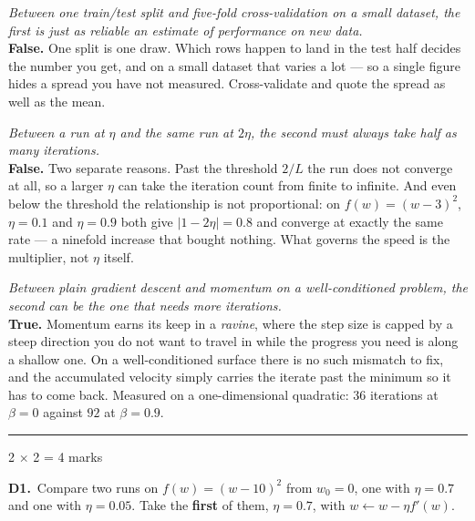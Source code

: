 \documentclass[10pt,a4paper]{article}
\newcommand{\parthead}[2]{\vspace{2pt}\noindent\rule{\linewidth}{0.4pt}\par\vspace{2pt}%
  \noindent{\bfseries Part #1}\hfill{\small #2}\par\vspace{1pt}}
\begin{document}
\begin{sC}

  \item \emph{Between one train/test split and five-fold cross-validation on a small dataset, the first is just as reliable an estimate of performance on new data.}\\[2pt] \textbf{False.} One split is one draw. Which rows happen to land in the test half decides the number you get, and on a small dataset that varies a lot --- so a single figure hides a spread you have not measured. Cross-validate and quote the spread as well as the mean.

  \item \emph{Between a run at $\eta$ and the same run at $2\eta$, the second must always take half as many iterations.}\\[2pt] \textbf{False.} Two separate reasons. Past the threshold $2/L$ the run does not converge at all, so a larger $\eta$ can take the iteration count from finite to infinite. And even below the threshold the relationship is not proportional: on $f(w) = (w-3)^2$, $\eta = 0.1$ and $\eta = 0.9$ both give $\lvert 1 - 2\eta \rvert = 0.8$ and converge at exactly the same rate --- a ninefold increase that bought nothing. What governs the speed is the multiplier, not $\eta$ itself.

  \item \emph{Between plain gradient descent and momentum on a well-conditioned problem, the second can be the one that needs more iterations.}\\[2pt] \textbf{True.} Momentum earns its keep in a \emph{ravine}, where the step size is capped by a steep direction you do not want to travel in while the progress you need is along a shallow one. On a well-conditioned surface there is no such mismatch to fix, and the accumulated velocity simply carries the iterate past the minimum so it has to come back. Measured on a one-dimensional quadratic: $36$ iterations at $\beta = 0$ against $92$ at $\beta = 0.9$.

\end{sC}

\newpage

\parthead{D --- Short answer}{2 $\times$ 2 = 4 marks}

\textbf{D1.}\ Compare two runs on $f(w) = (w-10)^2$ from $w_0 = 0$, one with $\eta = 0.7$ and one with $\eta = 0.05$. Take the \textbf{first} of them, $\eta = 0.7$, with $w \leftarrow w - \eta f'(w)$.

\vspace{2pt}
\end{document}
